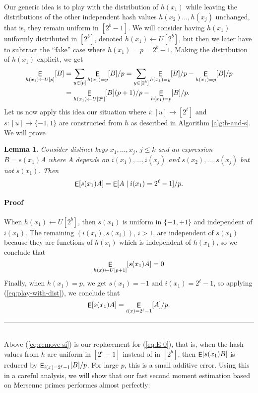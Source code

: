 \documentclass[12pt]{article}
\DeclareMathOperator*{\E}{\sf{E}}
\newcommand{\req}[1]{(\ref{#1})}
\newtheorem {lemma} {Lemma}[section]
\newcommand{\qed}{\rule{1ex}{1ex}}
\newenvironment{proof}[1][]{\paragraph*{Proof{#1}}}{\hfill \qed\smallskip\\}
\newcommand\fct\rightarrow
\begin{document}
Our generic idea is to play with the distribution of $h(x_1)$ while
leaving the distributions of the other independent hash values
$h(x_2)\ldots,h(x_j)$ unchanged, that is, they remain uniform in
$[2^b-1]$. We will consider having $h(x_1)$ uniformly distributed in
$[2^b]$, denoted $h(x_1)\gets U[2^b]$, but then we later have to
subtract the ``fake'' case where $h(x_1)=p=2^b-1$.  Making the
distribution of $h(x_1)$ explicit, we get
  \begin{align}
  \E_{h(x_1)\gets U[p]}[B]&=\sum_{y\in[p]}\E_{h(x_1)=y}[B]/p
  =\sum_{y\in[2^b]}\E_{h(x_1)=y}[B]/p-\E_{h(x_1)=p}[B]/p\nonumber\\
  &=\E_{h(x_1)\gets U[2^b]}[B](p+1)/p-\E_{h(x_1)=p}[B]/p.\label{eq:play-with-dist}
\end{align}
Let us now apply this idea our situation where $i:[u]\fct[2^\ell]$ and
$s:[u]\fct\{-1,1\}$ are constructed from $h$ as described in Algorithm
\ref{alg:h-and-s}. We will prove
\begin{lemma}\label{lem:remove-si}  Consider distinct keys $x_1,\ldots,x_j$, $j\leq k$ and an expression $B=s(x_1)A$ where $A$
depends on $i(x_1),\ldots,i(x_j)$ and $s(x_2),\ldots,s(x_j)$ but not
$s(x_1)$. Then
\begin{equation}\label{eq:remove-si}
  \E[s(x_1)A]=\E[A\mid i(x_1)=2^\ell-1]/p.
\end{equation}
\end{lemma}
\begin{proof}
When $h(x_1)\gets U[2^b]$, then $s(x_1)$ is uniform
in $\{-1,+1\}$ and independent of $i(x_1)$. The remaining
$(i(x_i),s(x_i))$, $i>1$, are independent of $s(x_1)$ because they
are functions of $h(x_i)$ which is independent of $h(x_1)$, so
we conclude that 
\[\E_{h(x)\gets U[p+1]}[s(x_1)A]=0\]
Finally, when $h(x_1)=p$, we get $s(x_1)=-1$ and $i(x_1)=2^\ell-1$, 
so applying \req{eq:play-with-dist}, we conclude
that 
\[\E[s(x_1)A]=\E_{i(x)=2^\ell-1}[A]/p.\]
\end{proof}
Above \req{eq:remove-si} is our replacement for \req{eq:E-0}, that is,
when the hash values from $h$ are uniform in $[2^b-1]$ instead of
in $[2^b]$, then $\E[s(x_1)B]$ is reduced by $\E_{i(x)=2^\ell-1}[B]/p$.
For large $p$, this is a small additive error. Using this in a careful
analysis, we will show that our fast second moment estimation 
based on Mersenne primes performes almost perfectly:
\end{document}
